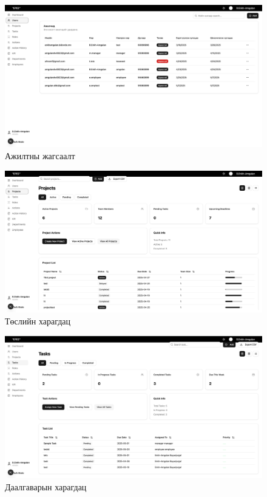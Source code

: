 \begin{figure}[H]
    \centering
    \includegraphics[scale=0.3]{src/images/uiux/listEmp.png}
    \caption{Ажилтны жагсаалт}
    \label{fig:list_emp_page}
\end{figure}

\begin{figure}[H]
    \centering
    \includegraphics[scale=0.3]{src/images/uiux/proj.png}
    \caption{Төслийн харагдац}
    \label{fig:proj_page}
\end{figure}

\begin{figure}[H]
    \centering
    \includegraphics[scale=0.3]{src/images/uiux/task.png}
    \caption{Даалгаварын харагдац}
    \label{fig:task_page}
\end{figure}

